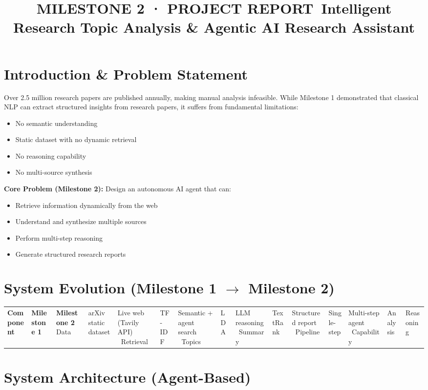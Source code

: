 \documentclass[11pt]{article}
\title{\textbf{MILESTONE 2 · PROJECT REPORT}\
Intelligent Research Topic Analysis & Agentic AI Research Assistant}
\date{}
\begin{document}
\maketitle

\section{Introduction & Problem Statement}

Over 2.5 million research papers are published annually, making manual analysis infeasible. While Milestone 1 demonstrated that classical NLP can extract structured insights from research papers, it suffers from fundamental limitations:

\begin{itemize}
\item No semantic understanding
\item Static dataset with no dynamic retrieval
\item No reasoning capability
\item No multi-source synthesis
\end{itemize}

\textbf{Core Problem (Milestone 2):} Design an autonomous AI agent that can:
\begin{itemize}
\item Retrieve information dynamically from the web
\item Understand and synthesize multiple sources
\item Perform multi-step reasoning
\item Generate structured research reports
\end{itemize}

\section{System Evolution (Milestone 1 $\rightarrow$ Milestone 2)}

\begin{tabular}{lll}
\toprule
\textbf{Component} & \textbf{Milestone 1} & \textbf{Milestone 2} \
\midrule
Data & arXiv static dataset & Live web (Tavily API) \
Retrieval & TF-IDF & Semantic + agent search \
Topics & LDA & LLM reasoning \
Summary & TextRank & Structured report \
Pipeline & Single-step & Multi-step agent \
Capability & Analysis & Reasoning \
\bottomrule
\end{tabular}

\section{System Architecture (Agent-Based)}
\end{document}
